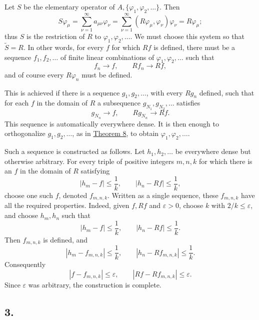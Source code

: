 ﻿\documentclass[paper=b5,fontsize=13pt,bookmarkpackage=false,twoside]{scrartcl}
\begin{document}
Let \(S\) be the elementary operator of
\(A,\{\varphi_1,\varphi_2,\ldots\}\).  Then
\[
  S\varphi_\mu
  =\sum_{\nu=1}^{\infty}a_{\mu\nu}\varphi_\nu
  =\sum_{\nu=1}^{\infty}(R\varphi_\mu,\varphi_\nu)\varphi_\nu
  =R\varphi_\mu;
\]
thus \(S\) is the restriction of \(R\) to
\(\varphi_1,\varphi_2,\ldots\).  We must choose this system so that
\(\widetilde S=R\).  In other words, for every \(f\) for which \(Rf\)
is defined, there must be a sequence \(f_1,f_2,\ldots\) of finite
linear combinations of \(\varphi_1,\varphi_2,\ldots\) such that
\[
  f_n\to f,\qquad Rf_n\to Rf,
\]
and of course every \(R\varphi_n\) must be defined.

This is achieved if there is a sequence \(g_1,g_2,\ldots\), with every
\(Rg_n\) defined, such that for each \(f\) in the domain of \(R\) a
subsequence \(g_{N_1},g_{N_2},\ldots\) satisfies
\[
  g_{N_n}\to f,\qquad Rg_{N_n}\to Rf.
\]
This sequence is automatically everywhere dense.  It is then enough
to orthogonalize \(g_1,g_2,\ldots\), as in
\hyperref[thm:8]{Theorem 8}, to obtain
\(\varphi_1,\varphi_2,\ldots\).

Such a sequence is constructed as follows.  Let \(h_1,h_2,\ldots\) be
everywhere dense but otherwise arbitrary.  For every triple of
positive integers \(m,n,k\) for which there is an \(f\) in the domain
of \(R\) satisfying
\[
  |h_m-f|\leq\frac1k,\qquad
  |h_n-Rf|\leq\frac1k,
\]
choose one such \(f\), denoted \(f_{m,n,k}\).  Written as a single
sequence, these \(f_{m,n,k}\) have all the required properties.
Indeed, given \(f,Rf\) and \(\varepsilon>0\), choose \(k\) with
\(2/k\leq\varepsilon\), and choose \(h_m,h_n\) such that
\[
  |h_m-f|\leq\frac1k,\qquad
  |h_n-Rf|\leq\frac1k.
\]
Then \(f_{m,n,k}\) is defined, and
\[
  |h_m-f_{m,n,k}|\leq\frac1k,\qquad
  |h_n-Rf_{m,n,k}|\leq\frac1k.
\]
Consequently
\[
  |f-f_{m,n,k}|\leq\varepsilon,\qquad
  |Rf-Rf_{m,n,k}|\leq\varepsilon.
\]
Since \(\varepsilon\) was arbitrary, the construction is complete.

\subsection*{3.}
\label{appIII:3}
\end{document}
